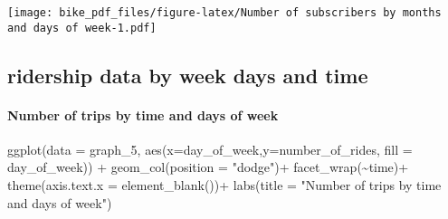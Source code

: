 \documentclass[
]{article}
\newenvironment{Shaded}{\begin{snugshade}}{\end{snugshade}}
\newcommand{\AttributeTok}[1]{\textcolor[rgb]{0.77,0.63,0.00}{#1}}
\newcommand{\FunctionTok}[1]{\textcolor[rgb]{0.00,0.00,0.00}{#1}}
\newcommand{\NormalTok}[1]{#1}
\newcommand{\OtherTok}[1]{\textcolor[rgb]{0.56,0.35,0.01}{#1}}
\newcommand{\SpecialCharTok}[1]{\textcolor[rgb]{0.00,0.00,0.00}{#1}}
\newcommand{\StringTok}[1]{\textcolor[rgb]{0.31,0.60,0.02}{#1}}
\begin{document}
\texttt{[image: bike\_pdf\_files/figure-latex/Number of subscribers by months and days of week-1.pdf]}

\hypertarget{ridership-data-by-week-days-and-time}{%
\subsection{ridership data by week days and
time}\label{ridership-data-by-week-days-and-time}}

\begin{Shaded}
\end{Shaded}

\hypertarget{number-of-trips-by-time-and-days-of-week}{%
\paragraph{Number of trips by time and days of
week}\label{number-of-trips-by-time-and-days-of-week}}

\begin{Shaded}
\begin{Highlighting}[]
\FunctionTok{ggplot}\NormalTok{(}\AttributeTok{data =}\NormalTok{ graph\_5, }\FunctionTok{aes}\NormalTok{(}\AttributeTok{x=}\NormalTok{day\_of\_week,}\AttributeTok{y=}\NormalTok{number\_of\_rides, }\AttributeTok{fill =}\NormalTok{ day\_of\_week)) }\SpecialCharTok{+}
  \FunctionTok{geom\_col}\NormalTok{(}\AttributeTok{position =} \StringTok{"dodge"}\NormalTok{)}\SpecialCharTok{+}
  \FunctionTok{facet\_wrap}\NormalTok{(}\SpecialCharTok{\textasciitilde{}}\NormalTok{time)}\SpecialCharTok{+}
  \FunctionTok{theme}\NormalTok{(}\AttributeTok{axis.text.x =} \FunctionTok{element\_blank}\NormalTok{())}\SpecialCharTok{+}
  \FunctionTok{labs}\NormalTok{(}\AttributeTok{title =} \StringTok{"Number of trips by time and days of week"}\NormalTok{)}
\end{Highlighting}
\end{Shaded}
\end{document}
